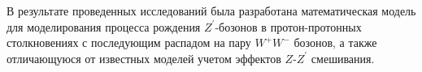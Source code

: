 В результате проведенных исследований была разработана
математическая модель для моделирования процесса рождения ${Z}^{\prime}$-бозонов в протон-протонных столкновениях с последующим распадом на пару ${W}^{+}{W}^{-}$ бозонов, а также отличающуюся от известных моделей учетом эффектов $Z$-${Z}^{\prime}$ смешивания.